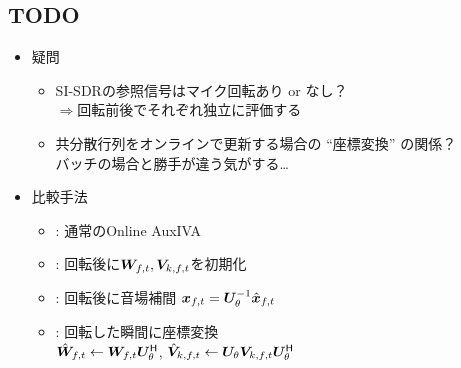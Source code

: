 \documentclass[twocolumn,9pt,dvipdfmx]{article}
\begin{document}
\subsection*{TODO}
\begin{itemize}
  \item 疑問
    \begin{itemize}
      \item SI-SDRの参照信号はマイク回転あり or なし？\\ $\Rightarrow$回転前後でそれぞれ独立に評価する
      \item 共分散行列をオンラインで更新する場合の ``座標変換'' の関係？\\ バッチの場合と勝手が違う気がする…
    \end{itemize}
  \item 比較手法
    \begin{itemize}
      \item {}: 通常のOnline AuxIVA
      \item {}: 回転後に$\Demix _{\ft}, \cov _{\src,\ft}$を初期化
      \item {}: 回転後に音場補間 $\Obs _{\ft} = \rotMat _{\rotDeg} ^{-1} \rotObs _{\ft}$
      \item {}: 回転した瞬間に座標変換\\
        $\rotDemix _{\ft} \gets \Demix _{\ft} \rotMat _{\rotDeg} ^{\hermite}$,\; $\rotCov _{\src,\ft} \gets \rotMat _{\rotDeg} \cov _{\src,\ft} \rotMat _{\rotDeg} ^{\hermite}$
    \end{itemize}
\end{itemize}
\end{document}

